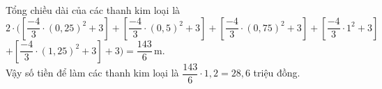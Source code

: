 \begin{bt}
{{
		}
		Tổng chiều dài của các thanh kim loại là\\
		$
		2\cdot \Big( \left[ \dfrac{-4}{3}\cdot (0{,}25)^2+3\right] +  \left[ \dfrac{-4}{3}\cdot (0{,}5)^2+3\right] + \left[ \dfrac{-4}{3}\cdot (0{,}75)^2+3\right] + \left[ \dfrac{-4}{3}\cdot 1^2+3\right]$\\
		 $+ \left[ \dfrac{-4}{3}\cdot (1{,}25)^2+3\right] +3 \Big) = \dfrac{143}{6} \mathrm{\, m}.
		$\\
		Vậy số tiền để làm các thanh kim loại là $\dfrac{143}{6} \cdot 1{,}2= 28{,}6$ triệu đồng.
	}
\end{bt}

